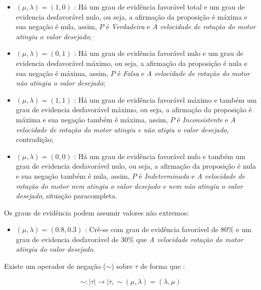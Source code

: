 \begin{itemize}
\item 
$(\mu, \lambda ) = (1,0)$ : Há um grau de evidência favorável total e um grau de evidencia desfavorável nulo, ou seja, a afirmação da proposição é máxima e sua negação é nula, assim,  $P$ é \emph{Verdadeira} e \emph{A velocidade de rotação do motor atingiu o valor desejado};

\item 
$(\mu, \lambda ) = (0,1)$ : Há um grau de evidência favorável nulo e um grau de evidencia desfavorável máximo, ou seja, a afirmação da proposição é nula e sua negação é máxima, assim,  $P$ é \emph{Falsa} e \emph{A velocidade de rotação do motor não atingiu o valor desejado};

\item 
$(\mu, \lambda ) = (1,1)$ : Há um grau de evidência favorável máximo e também um grau de evidencia desfavorável máximo, ou seja, a afirmação da proposição é máxima e sua negação também é máxima, assim,  $P$ é \emph{Inconsistente} e \emph{A velocidade de rotação do motor atingiu e não atigiu o valor desejado}, contradição;

\item 
$(\mu, \lambda ) = (0,0)$ : Há um grau de evidência favorável nulo e também um grau de evidencia desfavorável nulo, ou seja, a afirmação da proposição é nula e sua negação também é nula, assim,  $P$ é \emph{Indeterminada} e \emph{A velocidade de rotação do motor nem atingiu o valor desejado e nem não atingiu o valor desejado}, situação paracompleta.

\end{itemize}

Os graus de evidência podem assumir valores não extremos:

\begin{itemize}
\item 
$(\mu, \lambda ) = (0.8,0.3)$ : Crê-se com grau de evidência favorável de 80\% e um grau de evidencia desfavorável de 30\%  que \emph{A velocidade rotação do motor atingiu do valor desejado}.
\end{itemize}

Existe um operador de negação ($\sim $) sobre $\tau$ de forma que :
\begin{center}
\begin{equation}
\sim  : \mid \tau \mid \rightarrow \mid \tau , \sim(\mu, \lambda ) = (\lambda, \mu )
\end{equation}
\end{center}


